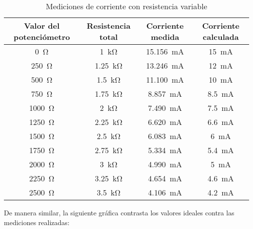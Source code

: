 \documentclass[a4paper,12pt]{article}
\begin{document}
\begin{table}[ht!]
\begin{center}
\begin{tabular}{|c c c c|}
	\hline
		Valor del potenciómetro & Resistencia total & Corriente medida & Corriente calculada\\ [0.5ex]
	\hline
	\SI{0}{\ohm} & \SI{1}{\kohm} & \SI{15.156}{\mA} & \SI{15}{\mA}\\ \hline
	\SI{250}{\ohm} & \SI{1.25}{\kohm} & \SI{13.246}{\mA} & \SI{12}{\mA}\\ \hline
	\SI{500}{\ohm} & \SI{1.5}{\kohm} & \SI{11.100}{\mA} & \SI{10}{\mA}\\ \hline
	\SI{750}{\ohm} & \SI{1.75}{\kohm} & \SI{8.857}{\mA} & \SI{8.5}{\mA}\\ \hline
	\SI{1000}{\ohm} & \SI{2}{\kohm} & \SI{7.490}{\mA} & \SI{7.5}{\mA}\\ \hline
	\SI{1250}{\ohm} & \SI{2.25}{\kohm} & \SI{6.620}{\mA} & \SI{6.6}{\mA}\\ \hline
	\SI{1500}{\ohm} & \SI{2.5}{\kohm} & \SI{6.083}{\mA} & \SI{6}{\mA}\\ \hline
	\SI{1750}{\ohm} & \SI{2.75}{\kohm} & \SI{5.334}{\mA} & \SI{5.4}{\mA}\\ \hline
	\SI{2000}{\ohm} & \SI{3}{\kohm} & \SI{4.990}{\mA} & \SI{5}{\mA}\\ \hline
	\SI{2250}{\ohm} & \SI{3.25}{\kohm} & \SI{4.654}{\mA} & \SI{4.6}{\mA}\\ \hline
	\SI{2500}{\ohm} & \SI{3.5}{\kohm} & \SI{4.106}{\mA} & \SI{4.2}{\mA}\\ \hline
\end{tabular}
\label{table:2}
\caption{Mediciones de corriente con resistencia variable}
\end{center}
\end{table}

\vspace{1cm}

De manera similar, la siguiente gráfica contrasta los valores ideales contra las mediciones realizadas:

\vspace{1cm}
\end{document}
